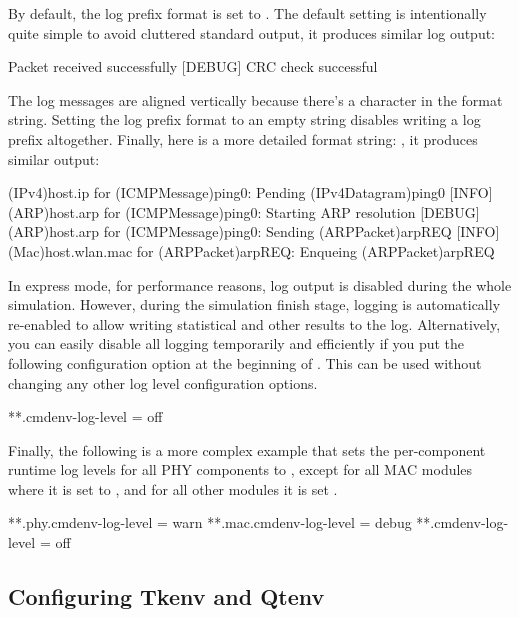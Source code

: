 By default, the log prefix format is set to . The
default setting is intentionally quite simple to avoid cluttered standard output,
it produces similar log output:

\begin{filelisting}
[INFO]  Packet received successfully
[DEBUG] CRC check successful
\end{filelisting}

The log messages are aligned vertically because there's a  character
in the format string. Setting the log prefix format to an empty string disables
writing a log prefix altogether. Finally, here is a more detailed format string:
, it produces similar output:

\begin{filelisting}
[INFO]  (IPv4)host.ip for (ICMPMessage)ping0:     Pending (IPv4Datagram)ping0
[INFO]  (ARP)host.arp for (ICMPMessage)ping0:     Starting ARP resolution
[DEBUG] (ARP)host.arp for (ICMPMessage)ping0:     Sending (ARPPacket)arpREQ
[INFO]  (Mac)host.wlan.mac for (ARPPacket)arpREQ: Enqueing (ARPPacket)arpREQ
\end{filelisting}

In express mode, for performance reasons, log output is disabled during the whole
simulation. However, during the simulation finish stage, logging is automatically
re-enabled to allow writing statistical and other results to the log. Alternatively,
you can easily disable all logging temporarily and efficiently if you put the
following configuration option at the beginning of . This
can be used without changing any other log level configuration options.

\begin{inifile}
[General]
**.cmdenv-log-level = off
\end{inifile}

Finally, the following is a more complex example that sets the per-component
runtime log levels for all PHY components to , except for
all MAC modules where it is set to , and for all other
modules it is set .

\begin{inifile}
[General]
**.phy.cmdenv-log-level = warn
**.mac.cmdenv-log-level = debug
**.cmdenv-log-level = off
\end{inifile}

\subsection{Configuring Tkenv and Qtenv}
\label{sec:config-sim:configuring-tkenv-and-qtenv}

